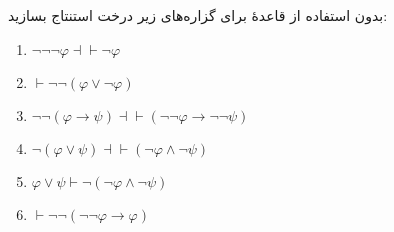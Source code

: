 
بدون استفاده از قاعدهٔ  برای گزاره‌های زیر درخت استنتاج بسازید:
\begin{enumerate}[label=(\alph*)]
    \item $\neg\neg\neg\varphi\dashv\vdash\neg\varphi$
    \item $\vdash\neg\neg(\varphi\vee\neg\varphi)$
    \item $\neg\neg(\varphi\to\psi)\dashv\vdash(\neg\neg\varphi\to\neg\neg\psi)$
    \item $\neg(\varphi\vee\psi)\dashv\vdash(\neg\varphi\wedge\neg\psi)$
    \item $\varphi\vee\psi\vdash\neg(\neg\varphi\wedge\neg\psi)$
    \item $\vdash\neg\neg(\neg\neg\varphi\to\varphi)$
\end{enumerate}\quad\vspace{-1cm}
